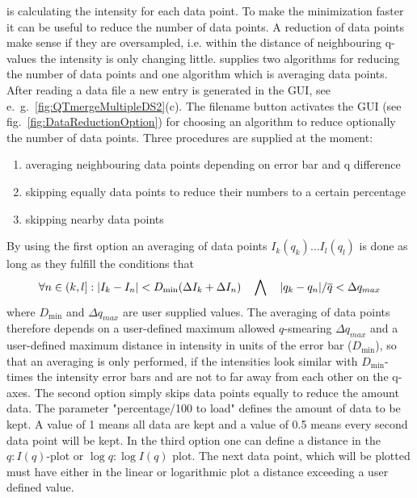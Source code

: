 \SASfit is calculating the intensity for each data point. To make the minimization faster it can be useful to reduce the number of data points. A reduction of data points make sense if they are oversampled, i.e. within the distance of neighbouring q-values the intensity is only changing little. \SASfit supplies two algorithms for reducing the number of data points and one algorithm which is averaging data points.
After reading a data file a new entry is generated in the GUI, see e.\ g.\  \ref{fig:QTmergeMultipleDS2}(c). The filename button activates the GUI (see fig.\ \ref{fig:DataReductionOption}) for choosing an algorithm to reduce optionally the number of data points. Three procedures are supplied at the moment:
\begin{enumerate}
\item averaging neighbouring data points depending on error bar and q difference
\item skipping equally data points to reduce their numbers to a certain percentage
\item skipping nearby data points
\end{enumerate}
 By using the first option an averaging of data points $I_k(q_k) \ldots I_l(q_l)$ is done as long as they fulfill the conditions that
\begin{align}
\forall n \in (k,l] : \abs{I_k-I_n} < D_\mathrm{min} (\Delta I_k + \Delta I_n)
\quad \bigwedge \quad \abs{q_k-q_n}/\overline{q} <  \Delta q_{max}
\end{align}
where $D_\mathrm{min} $ and $\Delta q_{max}$ are user supplied values.
The averaging of data points therefore depends on a user-defined maximum allowed $q$-smearing $\Delta q_{max}$ and  a user-defined maximum distance in intensity in units of the error bar ($D_\mathrm{min} $), so that an averaging is only performed, if the intensities look similar with $D_\mathrm{min}$-times the intensity error bars and are not to far away from each other on the q-axes.
The second option simply skips data points equally to reduce the amount data. The parameter "percentage/100 to load" defines the amount of data to be kept. A value of 1 means all data are kept and a value of 0.5 means every second data point will be kept. In the third option one can define a distance in the $q:I(q)$-plot or $\log q: \log I(q)$ plot. The next data point, which will be plotted must have either in the linear or logarithmic plot a distance exceeding a user defined value.

